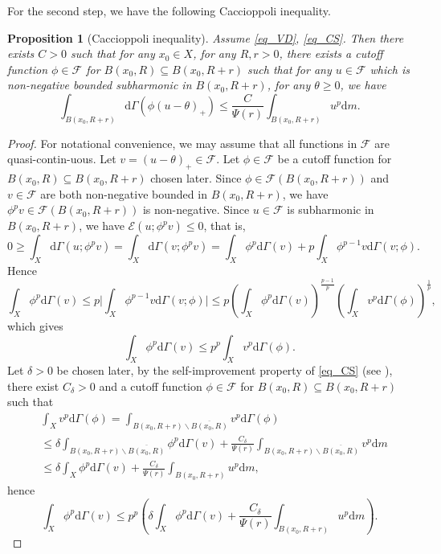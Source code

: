 \documentclass[11pt,a4paper]{article}
\numberwithin{equation}{section}
\theoremstyle{plain}
\newtheorem{proposition}[theorem]{Proposition}
\theoremstyle{definition}
\begin{document}
For the second step, we have the following Caccioppoli inequality.

\begin{proposition}[Caccioppoli inequality]\label{prop_Cacci}
Assume \ref{eq_VD}, \ref{eq_CS}. Then there exists $C>0$ such that for any $x_0\in X$, for any $R,r>0$, there exists a cutoff function $\phi\in\mathcal{F}$ for $B(x_0,R)\subseteq B(x_0,R+r)$ such that for any $u\in\mathcal{F}$ which is non-negative bounded subharmonic in $B(x_0,R+r)$, for any $\theta\ge0$, we have
$$\int_{B(x_0,R+r)}\mathrm{d}\Gamma(\phi(u-\theta)_+)\le \frac{C}{\Psi(r)}\int_{B(x_0,R+r)}u^p\mathrm{d} m.$$
\end{proposition}

\begin{proof}
For notational convenience, we may assume that all functions in $\mathcal{F}$ are quasi-contin-uous. Let $v=(u-\theta)_+\in\mathcal{F}$. Let $\phi\in\mathcal{F}$ be a cutoff function for $B(x_0,R)\subseteq B(x_0,R+r)$ chosen later. Since $\phi\in \mathcal{F}(B(x_0,R+r))$ and $v\in \mathcal{F}$ are both non-negative bounded in $B(x_0,R+r)$, we have $\phi^pv\in\mathcal{F}(B(x_0,R+r))$ is non-negative. Since $u\in\mathcal{F}$ is subharmonic in $B(x_0,R+r)$, we have $\mathcal{E}(u;\phi^pv)\le0$, that is,
$$0\ge\int_X\mathrm{d}\Gamma(u;\phi^pv)=\int_X\mathrm{d}\Gamma(v;\phi^pv)=\int_X\phi^p\mathrm{d}\Gamma(v)+p\int_X\phi^{p-1}v\mathrm{d}\Gamma(v;\phi).$$
Hence
$$\int_X\phi^p\mathrm{d}\Gamma(v)\le p\lvert\int_X\phi^{p-1}v\mathrm{d}\Gamma(v;\phi)\rvert\le p \left(\int_X\phi^p\mathrm{d}\Gamma(v)\right)^{\frac{p-1}{p}}\left(\int_Xv^p\mathrm{d}\Gamma(\phi)\right)^{\frac{1}{p}},$$
which gives
$$\int_X\phi^p\mathrm{d}\Gamma(v)\le p^p\int_Xv^p\mathrm{d}\Gamma(\phi).$$
Let $\delta>0$ be chosen later, by the self-improvement property of \ref{eq_CS} (see \cite[Proposition 3.1]{Yan25c}), there exist $C_\delta>0$ and a cutoff function $\phi\in\mathcal{F}$ for $B(x_0,R)\subseteq B(x_0,R+r)$ such that
\begin{align*}
&\int_Xv^p\mathrm{d}\Gamma(\phi)=\int_{B(x_0,R+r)\backslash\overline{B(x_0,R)}}v^p\mathrm{d}\Gamma(\phi)\\
&\le\delta\int_{B(x_0,R+r)\backslash\overline{B(x_0,R)}}\phi^p\mathrm{d}\Gamma(v)+\frac{C_\delta}{\Psi(r)}\int_{B(x_0,R+r)\backslash\overline{B(x_0,R)}}v^p\mathrm{d} m\\
&\le\delta\int_X\phi^p\mathrm{d}\Gamma(v)+\frac{C_\delta}{\Psi(r)}\int_{B(x_0,R+r)}u^p\mathrm{d} m,
\end{align*}
hence
$$\int_X\phi^p\mathrm{d}\Gamma(v)\le p^p \left(\delta\int_X\phi^p\mathrm{d}\Gamma(v)+\frac{C_\delta}{\Psi(r)}\int_{B(x_0,R+r)}u^p\mathrm{d} m\right).$$

\end{proof}
\end{document}
